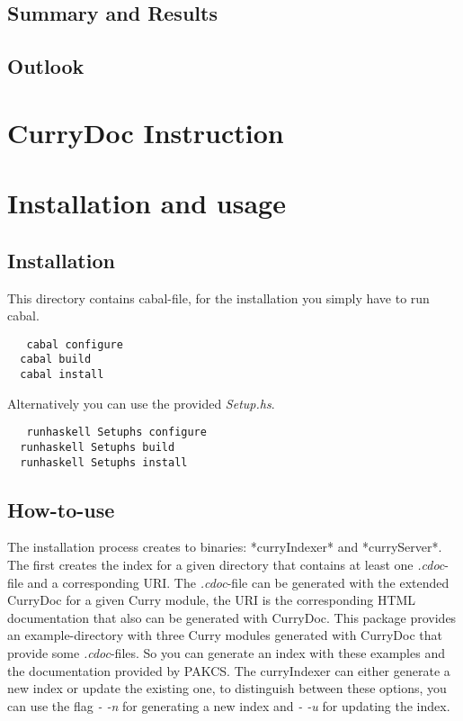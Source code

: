 \documentclass[%
	pdftex,%
	a4paper,%
	oneside,%
	chapterprefix,%
	headsepline,%
	12pt%
]{scrbook}
\begin{document}
\section{Summary and Results}
\section{Outlook}

\newpage
{}
\setcounter{page}{\value{roemisch}}

\appendix
\chapter{CurryDoc Instruction}\label{a:currydoc}

\chapter{Installation and usage}\label{a:currysearch}

\section{Installation}

This directory contains cabal-file, for the installation you simply
have to run cabal.

\begin{tabbing}\tt
~~cabal~configure~\\
\tt ~~cabal~build~\\
\tt ~~cabal~install
\end{tabbing}

Alternatively you can use the provided \emph{Setup.hs}.
\begin{tabbing}\tt
~~runhaskell~Setuphs~configure\\
\tt ~~runhaskell~Setuphs~build\\
\tt ~~runhaskell~Setuphs~install
\end{tabbing}

\section{How-to-use}

The installation process creates to binaries: *curryIndexer* and
*curryServer*. %
The first creates the index for a given directory that contains at
least one \emph{.cdoc}-file and a corresponding URI. %
The \emph{.cdoc}-file can be generated with the extended CurryDoc for
a given Curry module, the URI is the corresponding HTML documentation
that also can be generated with CurryDoc. %
This package provides an example-directory with three Curry modules
generated with CurryDoc that provide some \emph{.cdoc}-files. %
So you can generate an index with these examples and the documentation
provided by PAKCS. %
The curryIndexer can either generate a new index or update the
existing one, to distinguish between these options, you can use the
flag \emph{- -n} for generating a new index and \emph{- -u} for
updating the index.
\end{document}
